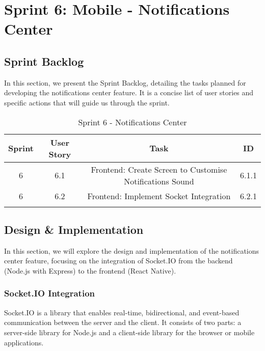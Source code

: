 \section{Sprint 6: Mobile - Notifications Center}

\subsection{Sprint Backlog}

In this section, we present the Sprint Backlog, detailing the tasks planned for developing the notifications center feature. It is a concise list of user stories and specific actions that will guide us through the sprint.

\setlength{\LTleft}{0pt}
\begin{longtable}{|c|c|c|c|}
\hline
\textbf{Sprint} & \textbf{User Story} & \textbf{Task} & \textbf{ID} \\
\hline
6 & 6.1 & Frontend: Create Screen to Customise Notifications Sound & 6.1.1 \\
\hline
6 & 6.2 & Frontend: Implement Socket Integration & 6.2.1 \\
\hline
\caption{Sprint 6 - Notifications Center}
\label{tab:sprint6_backlog}
\end{longtable}

\subsection{Design \& Implementation}

In this section, we will explore the design and implementation of the notifications center feature, focusing on the integration of Socket.IO from the backend (Node.js with Express) to the frontend (React Native).

\subsubsection{Socket.IO Integration}

Socket.IO is a library that enables real-time, bidirectional, and event-based communication between the server and the client. It consists of two parts: a server-side library for Node.js and a client-side library for the browser or mobile applications.

